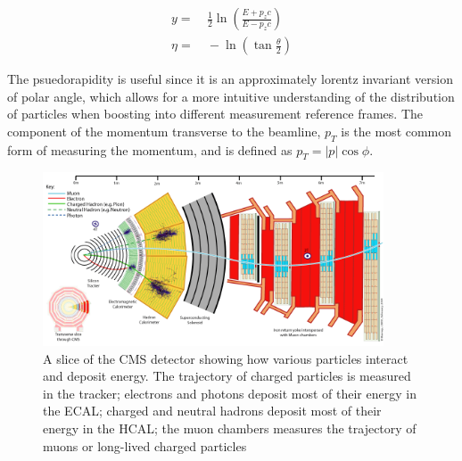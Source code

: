 \begin{equation}
\begin{aligned}
y =&~ \frac{1}{2}\ln\left({\frac{E+p_{z}c}{E-p_{z}c}}\right) \\
\eta =&~ -\ln\left(\tan{\frac{\theta}{2}}\right)
\end{aligned}
\end{equation}

\noindent The psuedorapidity is useful since it is an approximately lorentz
invariant version of polar angle, which allows for a more intuitive
understanding of the distribution of particles when boosting into
different measurement reference frames.  The component of the momentum
transverse to the beamline, $p_{T}$ is the most common form of
measuring the momentum, and is defined as $p_{T} = |p|\cos{\phi}$.  

\begin{figure}[h]
   \centering
  \includegraphics[width=0.9\textwidth]{Figures/CMS_Diagrams/CMS__Slice.png}
  \caption{A slice of the CMS detector showing how various particles
    interact and deposit energy.  The trajectory of charged particles
    is measured in the tracker; electrons and photons deposit most of
    their energy in the ECAL; charged and neutral hadrons deposit most
  of their energy in the HCAL; the muon chambers measures the
  trajectory of muons or long-lived charged particles} \label{fig:cms_slice}
\end{figure}


